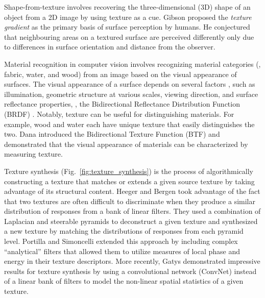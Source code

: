 Shape-from-texture involves recovering the
three-dimensional (3D) shape of an object from a 2D image by using texture as a 
cue. Gibson \cite{gibson1950perception} proposed the \emph{texture gradient} as 
the primary basis of surface perception by humans. He conjectured that neighbouring areas on a textured surface are perceived differently only due to differences
in surface orientation and distance from the observer.

Material recognition in computer vision involves recognizing material categories (\eg, fabric, water, and wood) from an image based on the visual appearance of surfaces. The visual appearance of a surface depends on several factors \cite{dana1999,adelson2001}, such as illumination, geometric structure at various scales, viewing direction, and surface reflectance properties, \eg, the Bidirectional Reflectance Distribution Function (BRDF) \cite{nayar1991}. Notably, texture can be useful for distinguishing materials. For example, wood and water each have unique texture that easily distinguishes the two. Dana \etal \cite{dana1999} introduced the Bidirectional Texture Function (BTF) and demonstrated that the visual appearance of materials can be characterized by measuring texture.



Texture synthesis (Fig.\ \ref{fig:texture_synthesis}) is the process of algorithmically constructing a texture that
matches or extends a given source texture by taking advantage of its structural 
content. Heeger and Bergen \cite{heeger1995pyramid} took advantage of the fact 
that two textures are often difficult to discriminate when they produce a similar 
distribution of responses from a bank of linear filters. They used a combination 
of Laplacian and steerable pyramids to deconstruct a given texture and 
synthesized a new texture by matching the distributions of responses from each
pyramid level. Portilla and Simoncelli \cite{portilla2000parametric} extended this approach by including complex ``analytical'' filters that allowed them to utilize measures of local phase and energy in their texture descriptors. More recently, Gatys \etal \cite{gatys2015} demonstrated 
impressive results for texture synthesis by using a convolutional network (ConvNet) instead of a linear 
bank of filters to model the non-linear spatial statistics of a given texture.




